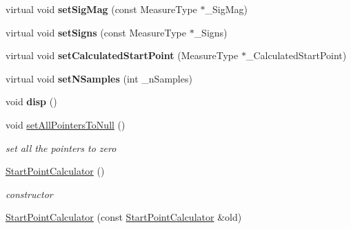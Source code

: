 \begin{DoxyCompactItemize}
\item 
virtual void {\bfseries set\+Sig\+Mag} (const Measure\+Type $\ast$\+\_\+\+Sig\+Mag)\hypertarget{class_ox_1_1_start_point_calculator_a7cff5323e92bc00fdc9baa2a3eef7a37}{}\label{class_ox_1_1_start_point_calculator_a7cff5323e92bc00fdc9baa2a3eef7a37}

\item 
virtual void {\bfseries set\+Signs} (const Measure\+Type $\ast$\+\_\+\+Signs)\hypertarget{class_ox_1_1_start_point_calculator_a1245375d6cad369f18ab4a32ddb28446}{}\label{class_ox_1_1_start_point_calculator_a1245375d6cad369f18ab4a32ddb28446}

\item 
virtual void {\bfseries set\+Calculated\+Start\+Point} (Measure\+Type $\ast$\+\_\+\+Calculated\+Start\+Point)\hypertarget{class_ox_1_1_start_point_calculator_aebb0511e802eff920369dec99b6c00fb}{}\label{class_ox_1_1_start_point_calculator_aebb0511e802eff920369dec99b6c00fb}

\item 
virtual void {\bfseries set\+N\+Samples} (int \+\_\+n\+Samples)\hypertarget{class_ox_1_1_start_point_calculator_a72195ac7840734cd9001d0303ab859f4}{}\label{class_ox_1_1_start_point_calculator_a72195ac7840734cd9001d0303ab859f4}

\item 
void {\bfseries disp} ()\hypertarget{class_ox_1_1_start_point_calculator_a1e68d3a23cee006d4dbdd47583c5d316}{}\label{class_ox_1_1_start_point_calculator_a1e68d3a23cee006d4dbdd47583c5d316}

\item 
void \hyperlink{class_ox_1_1_start_point_calculator_a00a48e8845623b57e414380924a3f82b}{set\+All\+Pointers\+To\+Null} ()\hypertarget{class_ox_1_1_start_point_calculator_a00a48e8845623b57e414380924a3f82b}{}\label{class_ox_1_1_start_point_calculator_a00a48e8845623b57e414380924a3f82b}

\begin{DoxyCompactList}\small\item\em set all the pointers to zero \end{DoxyCompactList}\item 
\hyperlink{class_ox_1_1_start_point_calculator_a408ce85b6fbf0ee69f4eca3176b814d6}{Start\+Point\+Calculator} ()\hypertarget{class_ox_1_1_start_point_calculator_a408ce85b6fbf0ee69f4eca3176b814d6}{}\label{class_ox_1_1_start_point_calculator_a408ce85b6fbf0ee69f4eca3176b814d6}

\begin{DoxyCompactList}\small\item\em constructor \end{DoxyCompactList}\item 
\hyperlink{class_ox_1_1_start_point_calculator_ab6b12ed8fa6b47b3335b5c7a92b94623}{Start\+Point\+Calculator} (const \hyperlink{class_ox_1_1_start_point_calculator}{Start\+Point\+Calculator} \&old)\hypertarget{class_ox_1_1_start_point_calculator_ab6b12ed8fa6b47b3335b5c7a92b94623}{}\label{class_ox_1_1_start_point_calculator_ab6b12ed8fa6b47b3335b5c7a92b94623}


\end{DoxyCompactItemize}
